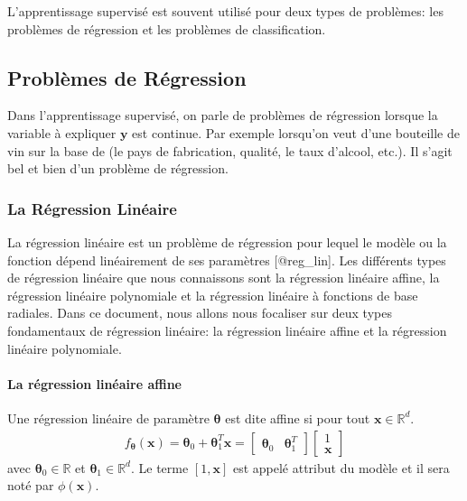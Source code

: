 \documentclass[letterpaper,11pt,english]{sphinxmanual}
\begin{document}
\sphinxAtStartPar
L’apprentissage supervisé est souvent utilisé pour deux types de
problèmes: les problèmes de régression et les problèmes de
classification.


\subsection{Problèmes de Régression}
\label{\detokenize{chapter3:problemes-de-regression}}
\sphinxAtStartPar
Dans l’apprentissage supervisé, on parle de problèmes de régression
lorsque la variable à expliquer \(\mathbf{y}\) est continue. Par
exemple lorsqu’on veut  d’une bouteille de vin sur la
base de  (le pays de fabrication, qualité, le
taux d’alcool, etc.). Il s’agit bel et bien d’un problème de régression.


\subsubsection{La Régression Linéaire}
\label{\detokenize{chapter3:la-regression-lineaire}}
\sphinxAtStartPar
La régression linéaire est un problème de régression pour lequel le
modèle ou la fonction dépend linéairement de ses paramètres {[}@reg\_lin{]}.
Les différents types de régression linéaire que nous connaissons sont la
régression linéaire affine, la régression linéaire polynomiale et la
régression linéaire à fonctions de base radiales. Dans ce document, nous
allons nous focaliser sur deux types fondamentaux de régression
linéaire: la régression linéaire affine et la régression linéaire
polynomiale.


\paragraph{La régression linéaire affine}
\label{\detokenize{chapter3:la-regression-lineaire-affine}}
\sphinxAtStartPar
Une régression linéaire de paramètre \(\boldsymbol{\theta}\) est
dite affine si pour tout \(\mathbf{x} \in \mathbb{R}^d.\)
\begin{equation}\label{equation:chapter3:chapter3:0}
\begin{split}f_{\boldsymbol{\theta}}(\mathbf{x}) = \boldsymbol{\theta}_{0} + \boldsymbol{\theta}_{1}^{T} \mathbf{x} = \begin{bmatrix} \boldsymbol{\theta}_0 & \boldsymbol{\theta}_1^{T} \end{bmatrix} \begin{bmatrix}
1 \\
\mathbf{x}
\end{bmatrix}\end{split}
\end{equation}
\sphinxAtStartPar
avec \(\boldsymbol{\theta}_0 \in \mathbb{R}\) et
\(\boldsymbol{\theta}_1 \in \mathbb{R}^d.\) Le terme
\(\left[ 1, \mathbf{x}\right]\) est appelé attribut du modèle et il
sera noté par \(\phi(\mathbf{x}).\)
\end{document}
